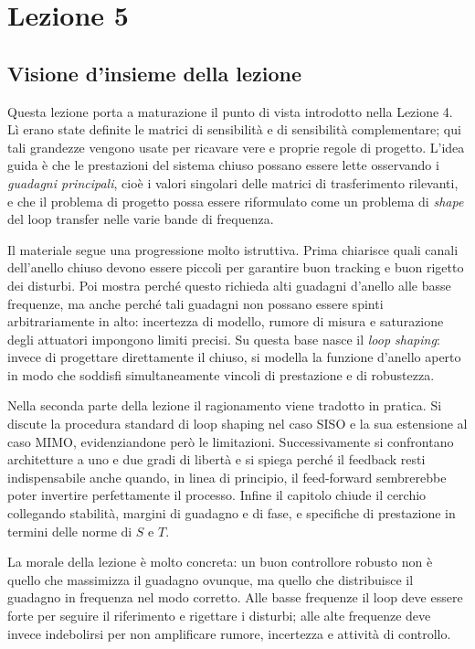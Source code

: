 \documentclass[11pt,a4paper]{article}
\begin{document}
\section{Lezione 5}

\subsection{Visione d'insieme della lezione}

Questa lezione porta a maturazione il punto di vista introdotto nella Lezione 4. Lì erano state definite le matrici di sensibilità e di sensibilità complementare; qui tali grandezze vengono usate per ricavare vere e proprie regole di progetto. L'idea guida è che le prestazioni del sistema chiuso possano essere lette osservando i \emph{guadagni principali}, cioè i valori singolari delle matrici di trasferimento rilevanti, e che il problema di progetto possa essere riformulato come un problema di \emph{shape} del loop transfer nelle varie bande di frequenza.

Il materiale segue una progressione molto istruttiva. Prima chiarisce quali canali dell'anello chiuso devono essere piccoli per garantire buon tracking e buon rigetto dei disturbi. Poi mostra perché questo richieda alti guadagni d'anello alle basse frequenze, ma anche perché tali guadagni non possano essere spinti arbitrariamente in alto: incertezza di modello, rumore di misura e saturazione degli attuatori impongono limiti precisi. Su questa base nasce il \emph{loop shaping}: invece di progettare direttamente il chiuso, si modella la funzione d'anello aperto in modo che soddisfi simultaneamente vincoli di prestazione e di robustezza.

Nella seconda parte della lezione il ragionamento viene tradotto in pratica. Si discute la procedura standard di loop shaping nel caso SISO e la sua estensione al caso MIMO, evidenziandone però le limitazioni. Successivamente si confrontano architetture a uno e due gradi di libertà e si spiega perché il feedback resti indispensabile anche quando, in linea di principio, il feed-forward sembrerebbe poter invertire perfettamente il processo. Infine il capitolo chiude il cerchio collegando stabilità, margini di guadagno e di fase, e specifiche di prestazione in termini delle norme di $S$ e $T$.

\begin{keybox}
La morale della lezione è molto concreta: un buon controllore robusto non è quello che massimizza il guadagno ovunque, ma quello che distribuisce il guadagno in frequenza nel modo corretto. Alle basse frequenze il loop deve essere forte per seguire il riferimento e rigettare i disturbi; alle alte frequenze deve invece indebolirsi per non amplificare rumore, incertezza e attività di controllo.
\end{keybox}
\end{document}
